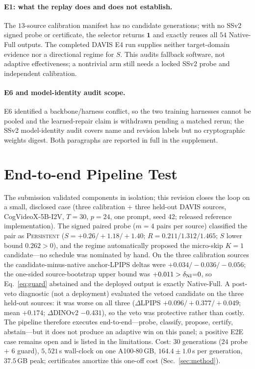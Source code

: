 \documentclass[letterpaper]{article}
\begin{document}
\paragraph{E1: what the replay does and does not establish.}
The $13$-source calibration manifest has no candidate generations; with no
SSv2 signed probe or certificate, the selector returns $\mathbf1$ and
exactly reuses all $54$ Native-Full outputs. The completed DAVIS E4 run
supplies neither target-domain evidence nor a directional regime for $S$.
This audits fallback software, not adaptive effectiveness; a nontrivial
arm still needs a locked SSv2 probe and independent calibration.

\paragraph{E6 and model-identity audit scope.}
E6 identified a backbone/harness conflict, so the two training harnesses
cannot be pooled and the learned-repair claim is withdrawn pending a
matched rerun; the SSv2 model-identity audit covers name and revision
labels but no cryptographic weights digest. Both paragraphs are reported
in full in the supplement.

\section{End-to-end Pipeline Test}
\label{sec:e2e}
The submission validated components in isolation; this revision closes
the loop on a small, disclosed case (three calibration + three held-out
DAVIS sources, CogVideoX-5B-I2V, $T{=}30$, $p{=}24$, one prompt, seed
42; released reference implementation). The signed paired probe
($m{=}4$ pairs per source) classified the pair as \textsc{Persistent}
($S{=}{+}0.26/{+}1.18/{+}1.40$; $R{=}0.211/1.312/1.465$; $S$ lower
bound $0.262>0$), and the regime automatically proposed the
micro-skip $K{=}1$ candidate---no schedule was nominated by hand. On
the three calibration sources the candidate-minus-native anchor-LPIPS
deltas were $+0.034/-0.036/-0.056$; the one-sided source-bootstrap
upper bound was $+0.011>\delta_{\rm NI}{=}0$, so Eq.~\eqref{eq:guard}
abstained and the deployed output is exactly Native-Full. A post-veto
diagnostic (not a deployment) evaluated the vetoed candidate on the
three held-out sources: it was worse on all three ($\Delta$LPIPS
$+0.096/+0.377/+0.049$; mean $+0.174$; $\Delta$DINOv2 $-0.431$), so
the veto was protective rather than costly. The pipeline therefore
executes end-to-end---probe, classify, propose, certify, abstain---but
it does not produce an adaptive win on this panel; a positive E2E case
remains open and is listed in the limitations. Cost: $30$ generations
($24$ probe $+$ $6$ guard), $5{,}521$\,s wall-clock on one A100-80\,GB,
$164.4{\pm}1.0$\,s per generation, $37.5$\,GB peak; certificates
amortize this one-off cost (Sec.~\ref{sec:method}).
\end{document}
